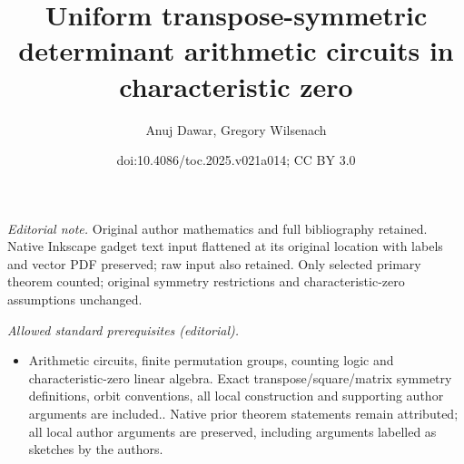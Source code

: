 \documentclass[11pt]{article}
\title{Uniform transpose-symmetric determinant arithmetic circuits in characteristic zero}
\author{Anuj Dawar, Gregory Wilsenach}
\date{doi:10.4086/toc.2025.v021a014; CC BY 3.0}
\begin{document}
\maketitle
\noindent\textit{Editorial note.} Original author mathematics and full bibliography retained. Native Inkscape gadget text input flattened at its original location with labels and vector PDF preserved; raw input also retained. Only selected primary theorem counted; original symmetry restrictions and characteristic-zero assumptions unchanged.\par\medskip
\noindent\textit{Allowed standard prerequisites (editorial).}\begin{itemize}
\item Arithmetic circuits, finite permutation groups, counting logic and characteristic-zero linear algebra. Exact transpose/square/matrix symmetry definitions, orbit conventions, all local construction and supporting author arguments are included.. Native prior theorem statements remain attributed; all local author arguments are preserved, including arguments labelled as sketches by the authors.
\end{itemize}\medskip
\end{document}
